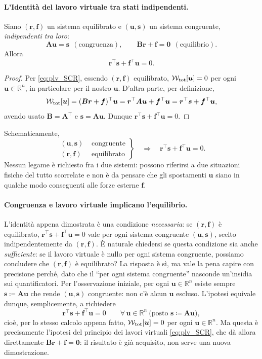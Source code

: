 \paragraph{L'Identità del lavoro virtuale tra stati indipendenti.}
Siano $(\bm r,\bm f)$ un sistema equilibrato e $(\bm u,\bm s)$
un sistema congruente, \textit{indipendenti tra loro}:
\[
\bm A\bm u=\bm s
\ \ (\text{congruenza}),
\qquad
\bm B\bm r+\bm f=\bm 0
\ \ (\text{equilibrio}).
\]
Allora
\begin{equation}\label{eq:reciprocita_SCR}
	\bm r^{\top}\bm s + \bm f^{\top}\bm u = 0.
\end{equation}
\begin{proof}
	Per \eqref{eq:plv_SCR}, essendo $(\bm r,\bm f)$ equilibrato,
	$\mathcal{W}_{\rm tot}[\bm u]=0$ per ogni $\bm u\in\mathbb R^n$, in
	particolare per il nostro $\bm u$. D'altra parte, per
	definizione,
	\[
	\mathcal{W}_{\rm tot}[\bm u]=(\bm B\bm r+\bm f)^\top\bm u
	=\bm r^\top\bm A\bm u+\bm f^\top\bm u
	=\bm r^\top\bm s+\bm f^\top\bm u,
	\]
	avendo usato $\bm B=\bm A^\top$ e $\bm s=\bm A\bm u$. Dunque
	$\bm r^\top\bm s+\bm f^\top\bm u=0$.
\end{proof}
\medskip
Schematicamente,
\[
\left.
\begin{aligned}
	(\bm u,\bm s) &\text{ congruente}\\
	(\bm r,\bm f) &\text{ equilibrato}
\end{aligned}
\right\}
\quad\Longrightarrow\quad
\bm r^\top\bm s+\bm f^\top\bm u=0.
\]
Nessun legame è richiesto fra i due sistemi: possono riferirsi
a due situazioni fisiche del tutto scorrelate e non è da pensare che gli spostamenti $\bm{u}$ siano in qualche modo conseguenti
alle forze esterne $\bm{f}$.

\paragraph{Congruenza e lavoro virtuale implicano l'equilibrio.}
L'identità appena dimostrata è una condizione \emph{necessaria}:
se $(\bm r,\bm f)$ è equilibrato, $\bm r^\top\bm s+\bm f^\top\bm
u=0$ vale per ogni sistema congruente $(\bm u,\bm s)$, scelto
indipendentemente da $(\bm r,\bm f)$. È naturale chiedersi se
questa condizione sia anche \emph{sufficiente}: se il lavoro
virtuale è nullo per ogni sistema congruente, possiamo concludere
che $(\bm r,\bm f)$ è equilibrato? La risposta è sì, ma vale la
pena capire con precisione perché, dato che il ``per ogni sistema
congruente'' nasconde un'insidia sui quantificatori. Per
l'osservazione iniziale, per ogni $\bm u\in\mathbb R^n$ esiste
sempre $\bm s\coloneqq\bm A\bm u$ che rende $(\bm u,\bm s)$
congruente: non c'è alcun $\bm u$ escluso. L'ipotesi equivale
dunque, semplicemente, a richiedere
\[
\bm r^\top\bm s+\bm f^\top\bm u=0
\qquad\forall\,\bm u\in\mathbb R^n\ \big(\text{posto }\bm s\coloneqq\bm A\bm u\big),
\]
cioè, per lo stesso calcolo appena fatto,
$\mathcal{W}_{\rm tot}[\bm u]=0$ per ogni $\bm u\in\mathbb R^n$. Ma
questa è precisamente l'ipotesi del principio dei lavori
virtuali \eqref{eq:plv_SCR}, che dà allora direttamente
$\bm B\bm r+\bm f=\bm 0$: il risultato è già acquisito, non
serve una nuova dimostrazione.


